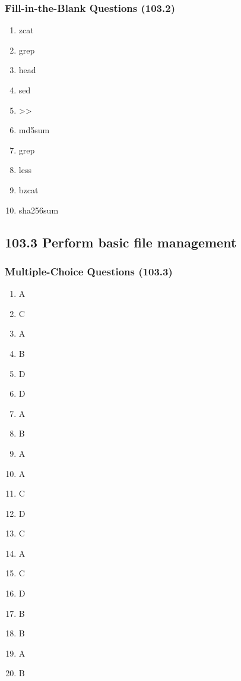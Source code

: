 \documentclass[a4paper]{report}
\begin{document}
\subsubsection*{Fill-in-the-Blank Questions (103.2)}
\begin{enumerate}[1.]
    \item zcat
    \item grep
    \item head
    \item sed
    \item >>
    \item md5sum
    \item grep
    \item less
    \item bzcat
    \item sha256sum
\end{enumerate}
\subsection*{103.3 Perform basic file management}
\subsubsection*{Multiple-Choice Questions (103.3)}

\begin{enumerate}[1.]
    \item A
    \item C
    \item A
    \item B
    \item D
    \item D
    \item A
    \item B
    \item A
    \item A
    \item C
    \item D
    \item C
    \item A
    \item C
    \item D
    \item B
    \item B
    \item A
    \item B
\end{enumerate}
\end{document}
